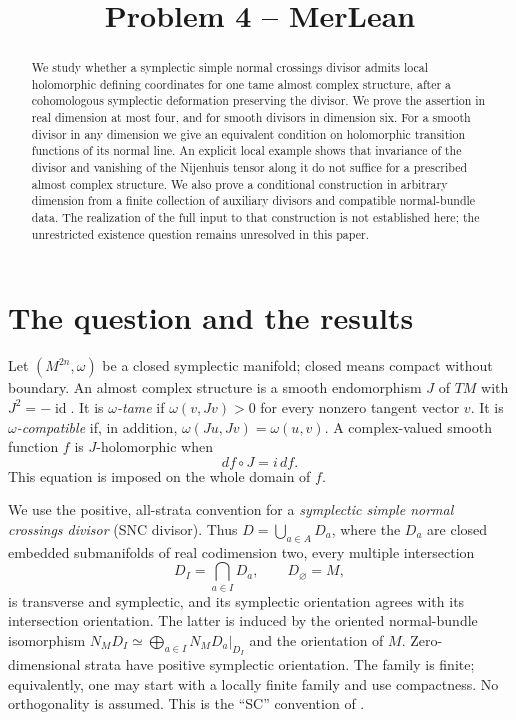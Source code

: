 \documentclass[11pt]{article}
\title{Problem 4 -- MerLean}
\author{}
\date{}
\theoremstyle{definition}
\theoremstyle{remark}
\newcommand{\id}{\operatorname{id}}
\begin{document}
\maketitle
\begin{abstract}
We study whether a symplectic simple normal crossings divisor admits local holomorphic defining coordinates for one tame almost complex structure, after a cohomologous symplectic deformation preserving the divisor. We prove the assertion in real dimension at most four, and for smooth divisors in dimension six. For a smooth divisor in any dimension we give an equivalent condition on holomorphic transition functions of its normal line. An explicit local example shows that invariance of the divisor and vanishing of the Nijenhuis tensor along it do not suffice for a prescribed almost complex structure. We also prove a conditional construction in arbitrary dimension from a finite collection of auxiliary divisors and compatible normal-bundle data. The realization of the full input to that construction is not established here; the unrestricted existence question remains unresolved in this paper.
\end{abstract}

\section{The question and the results}

Let $(M^{2n},\omega)$ be a closed symplectic manifold; closed means compact without boundary. An almost complex structure is a smooth endomorphism $J$ of $TM$ with $J^2=-\id$. It is \emph{$\omega$-tame} if $\omega(v,Jv)>0$ for every nonzero tangent vector $v$. It is \emph{$\omega$-compatible} if, in addition, $\omega(Ju,Jv)=\omega(u,v)$. A complex-valued smooth function $f$ is $J$-holomorphic when
\begin{equation}\label{eq:holomorphic}
 df\circ J=i\,df.
\end{equation}
This equation is imposed on the whole domain of $f$.

We use the positive, all-strata convention for a \emph{symplectic simple normal crossings divisor} (SNC divisor). Thus $D=\bigcup_{a\in A}D_a$, where the $D_a$ are closed embedded submanifolds of real codimension two, every multiple intersection
\[
 D_I=\bigcap_{a\in I}D_a,\qquad D_\varnothing=M,
\]
is transverse and symplectic, and its symplectic orientation agrees with its intersection orientation. The latter is induced by the oriented normal-bundle isomorphism
$N_MD_I\simeq\bigoplus_{a\in I}N_MD_a|_{D_I}$ and the orientation of $M$.
Zero-dimensional strata have positive symplectic orientation. The family is finite; equivalently, one may start with a locally finite family and use compactness. No orthogonality is assumed. This is the ``SC'' convention of \cite[Definition 2.1]{TMZ}.
\end{document}

